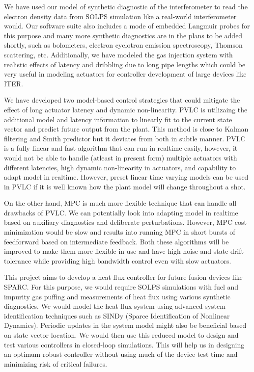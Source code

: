 {We have used our model of synthetic diagnostic of the interferometer to read the electron density data from SOLPS simulation like a real-world interferometer would. Our software suite also includes a mode of embedded Langmuir probes for this purpose and many more synthetic diagnostics are in the plans to be added shortly, such as bolometers, electron cyclotron emission spectroscopy, Thomson scattering, etc. Additionally, we have modeled the gas injection system with realistic effects of latency and dribbling due to long pipe lengths which could be very useful in modeling actuators for controller development of large devices like ITER\cite{holtkap_2007_fed}.

We have developed two model-based control strategies that could mitigate the effect of long actuator latency and dynamic non-linearity. \ac{PVLC} is utilizaing the additional model and latency information to linearly fit to the current state vector and predict future output from the plant. This method is close to Kalman\cite{Kalman1960} filtering and Smith predictor\cite{Smith1957} but it deviates from both in subtle manner. \ac{PVLC} is a fully linear and fast algorithm that can run in realtime easily, however, it would not be able to handle (atleast in present form) multiple actuators with different latencies, high dynamic non-linearity in actuators, and capability to adapt model in realtime. However, preset linear time varying models can be used in PVLC if it is well known how the plant model will change throughout a shot.

On the other hand, \ac{MPC} is much more flexible technique that can handle all drawbacks of \ac{PVLC}. We can potentially look into adapting model in realtime based on auxiliary diagnostics and deliberate perturbations. However, \ac{MPC} cost minimization would be slow and results into running MPC in short bursts of feedforward based on intermediate feedback. Both these algorithms will be improved to make them more flexible in use and have high noise and state drift tolerance while providing high bandwidth control even with slow actuators.

This project aims to develop a heat flux controller for future fusion devices like SPARC\cite{Creely_2020}. For this purpose, we would require SOLPS simulations with fuel and impurity gas puffing and measurements of heat flux using various synthetic diagnostics. We would model the heat flux system using advanced system identification techniques such as SINDy (Sparce Identification of Nonlinear Dynamics)\cite{brunton_2016}. Periodic updates in the system model might also be beneficial based on state vector location. We would then use this reduced model to design and test various controllers in closed-loop simulations. This will help us in designing an optimum robust controller without using much of the device test time and minimizing risk of critical failures.

}
